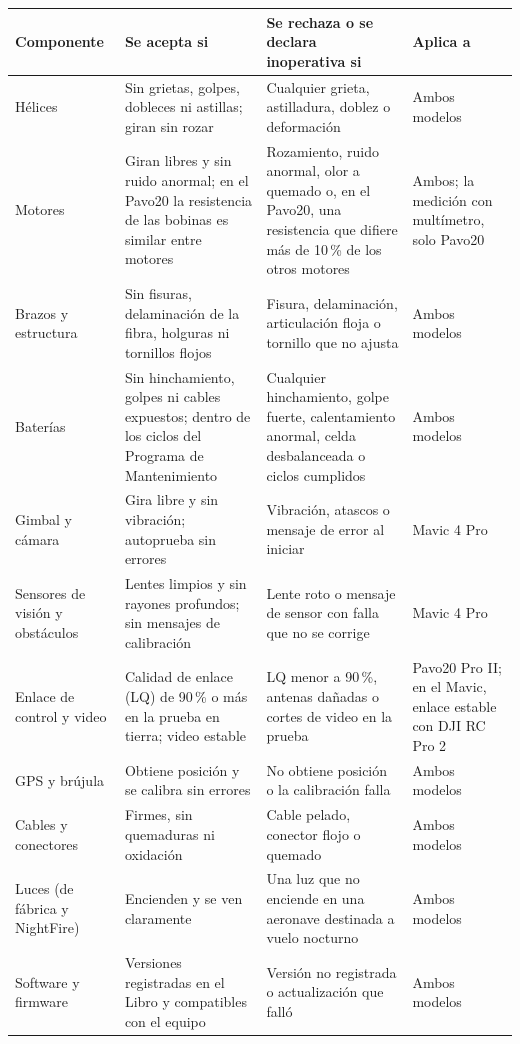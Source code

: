 \begin{longtable}{|>{\raggedright\arraybackslash}p{2.6cm}|>{\raggedright\arraybackslash}p{3.9cm}|>{\raggedright\arraybackslash}p{3.4cm}|>{\raggedright\arraybackslash}p{3.4cm}|}
\hline
\rowcolor[gray]{0.9}\textbf{Componente} & \textbf{Se acepta si} & \textbf{Se rechaza o se declara inoperativa si} & \textbf{Aplica a} \\ \hline
\endhead
Hélices & Sin grietas, golpes, dobleces ni astillas; giran sin rozar & Cualquier grieta, astilladura, doblez o deformación & Ambos modelos \\ \hline
Motores & Giran libres y sin ruido anormal; en el Pavo20 la resistencia de las bobinas es similar entre motores & Rozamiento, ruido anormal, olor a quemado o, en el Pavo20, una resistencia que difiere más de 10\,\% de los otros motores & Ambos; la medición con multímetro, solo Pavo20 \\ \hline
Brazos y estructura & Sin fisuras, delaminación de la fibra, holguras ni tornillos flojos & Fisura, delaminación, articulación floja o tornillo que no ajusta & Ambos modelos \\ \hline
Baterías & Sin hinchamiento, golpes ni cables expuestos; dentro de los ciclos del Programa de Mantenimiento & Cualquier hinchamiento, golpe fuerte, calentamiento anormal, celda desbalanceada o ciclos cumplidos & Ambos modelos \\ \hline
Gimbal y cámara & Gira libre y sin vibración; autoprueba sin errores & Vibración, atascos o mensaje de error al iniciar & Mavic 4 Pro \\ \hline
Sensores de visión y obstáculos & Lentes limpios y sin rayones profundos; sin mensajes de calibración & Lente roto o mensaje de sensor con falla que no se corrige & Mavic 4 Pro \\ \hline
Enlace de control y video & Calidad de enlace (LQ) de 90\,\% o más en la prueba en tierra; video estable & LQ menor a 90\,\%, antenas dañadas o cortes de video en la prueba & Pavo20 Pro II; en el Mavic, enlace estable con DJI RC Pro 2 \\ \hline
GPS y brújula & Obtiene posición y se calibra sin errores & No obtiene posición o la calibración falla & Ambos modelos \\ \hline
Cables y conectores & Firmes, sin quemaduras ni oxidación & Cable pelado, conector flojo o quemado & Ambos modelos \\ \hline
Luces (de fábrica y NightFire) & Encienden y se ven claramente & Una luz que no enciende en una aeronave destinada a vuelo nocturno & Ambos modelos \\ \hline
Software y firmware & Versiones registradas en el Libro y compatibles con el equipo & Versión no registrada o actualización que falló & Ambos modelos \\ \hline
\end{longtable}

